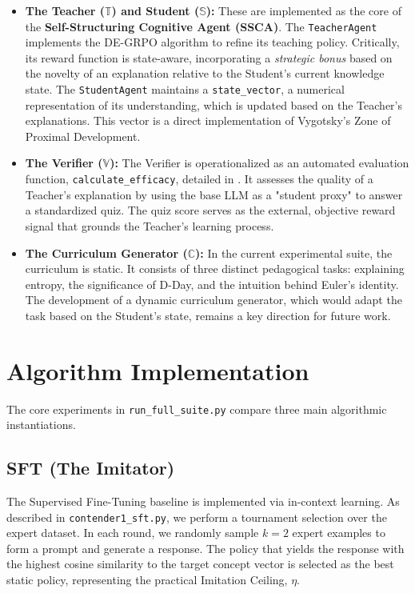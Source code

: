 \begin{itemize}
    \item \textbf{The Teacher ($\mathbb{T}$) and Student ($\mathbb{S}$):} These are implemented as the core of the \textbf{Self-Structuring Cognitive Agent (SSCA)}. The \texttt{TeacherAgent} implements the DE-GRPO algorithm to refine its teaching policy. Critically, its reward function is state-aware, incorporating a \emph{strategic bonus} based on the novelty of an explanation relative to the Student's current knowledge state. The \texttt{StudentAgent} maintains a \texttt{state\_vector}, a numerical representation of its understanding, which is updated based on the Teacher's explanations. This vector is a direct implementation of Vygotsky's Zone of Proximal Development.
    
    \item \textbf{The Verifier ($\mathbb{V}$):} The Verifier is operationalized as an automated evaluation function, \texttt{calculate\_efficacy}, detailed in . It assesses the quality of a Teacher's explanation by using the base LLM as a "student proxy" to answer a standardized quiz. The quiz score serves as the external, objective reward signal that grounds the Teacher's learning process.
    
    \item \textbf{The Curriculum Generator ($\mathbb{C}$):} In the current experimental suite, the curriculum is static. It consists of three distinct pedagogical tasks: explaining entropy, the significance of D-Day, and the intuition behind Euler's identity. The development of a dynamic curriculum generator, which would adapt the task based on the Student's state, remains a key direction for future work.
\end{itemize}

\section{Algorithm Implementation}
\label{sec:algo_implementation}
The core experiments in \texttt{run\_full\_suite.py} compare three main algorithmic instantiations.

\subsection{SFT (The Imitator)}
The Supervised Fine-Tuning baseline is implemented via in-context learning. As described in \texttt{contender1\_sft.py}, we perform a tournament selection over the expert dataset. In each round, we randomly sample $k=2$ expert examples to form a prompt and generate a response. The policy that yields the response with the highest cosine similarity to the target concept vector is selected as the best static policy, representing the practical Imitation Ceiling, $\eta$.

